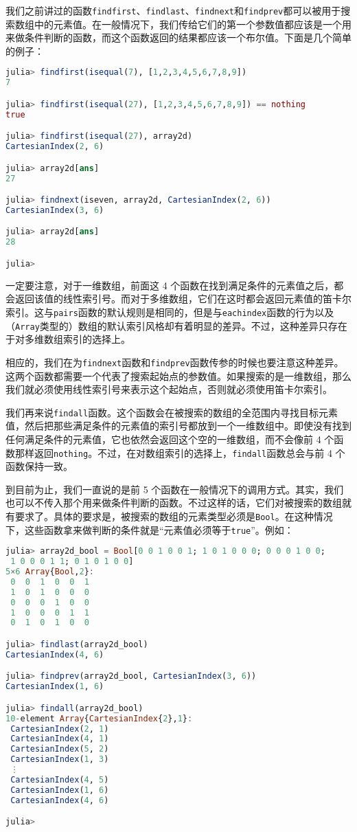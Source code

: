 我们之前讲过的函数\verb`findfirst`、\verb`findlast`、\verb`findnext`和\verb`findprev`都可以被用于搜索数组中的元素值。在一般情况下，我们传给它们的第一个参数值都应该是一个用来做条件判断的函数，而这个函数返回的结果都应该一个布尔值。下面是几个简单的例子：

\begin{lstlisting}[language=julia]
julia> findfirst(isequal(7), [1,2,3,4,5,6,7,8,9])
7

julia> findfirst(isequal(27), [1,2,3,4,5,6,7,8,9]) == nothing
true

julia> findfirst(isequal(27), array2d)
CartesianIndex(2, 6)

julia> array2d[ans]
27

julia> findnext(iseven, array2d, CartesianIndex(2, 6))
CartesianIndex(3, 6)

julia> array2d[ans]
28

julia> 
\end{lstlisting}

一定要注意，对于一维数组，前面这 4 个函数在找到满足条件的元素值之后，都会返回该值的线性索引号。而对于多维数组，它们在这时都会返回元素值的笛卡尔索引。这与\verb`pairs`函数的默认规则是相同的，但是与\verb`eachindex`函数的行为以及（\verb`Array`类型的）数组的默认索引风格却有着明显的差异。不过，这种差异只存在于对多维数组索引的选择上。

相应的，我们在为\verb`findnext`函数和\verb`findprev`函数传参的时候也要注意这种差异。这两个函数都需要一个代表了搜索起始点的参数值。如果搜索的是一维数组，那么我们就必须使用线性索引号来表示这个起始点，否则就必须使用笛卡尔索引。

我们再来说\verb`findall`函数。这个函数会在被搜索的数组的全范围内寻找目标元素值，然后把那些满足条件的元素值的索引号都放到一个一维数组中。即使没有找到任何满足条件的元素值，它也依然会返回这个空的一维数组，而不会像前 4 个函数那样返回\verb`nothing`。不过，在对数组索引的选择上，\verb`findall`函数总会与前 4 个函数保持一致。

到目前为止，我们一直说的是前 5 个函数在一般情况下的调用方式。其实，我们也可以不传入那个用来做条件判断的函数。不过这样的话，它们对被搜索的数组就有要求了。具体的要求是，被搜索的数组的元素类型必须是\verb`Bool`。在这种情况下，这些函数拿来做判断的条件就是“元素值必须等于\verb`true`”。例如：

\begin{lstlisting}[language=julia]
julia> array2d_bool = Bool[0 0 1 0 0 1; 1 0 1 0 0 0; 0 0 0 1 0 0;
 1 0 0 0 1 1; 0 1 0 1 0 0]
5×6 Array{Bool,2}:
 0  0  1  0  0  1
 1  0  1  0  0  0
 0  0  0  1  0  0
 1  0  0  0  1  1
 0  1  0  1  0  0

julia> findlast(array2d_bool)
CartesianIndex(4, 6)

julia> findprev(array2d_bool, CartesianIndex(3, 6))
CartesianIndex(1, 6)

julia> findall(array2d_bool)
10-element Array{CartesianIndex{2},1}:
 CartesianIndex(2, 1)
 CartesianIndex(4, 1)
 CartesianIndex(5, 2)
 CartesianIndex(1, 3)
 ⋮                   
 CartesianIndex(4, 5)
 CartesianIndex(1, 6)
 CartesianIndex(4, 6)

julia> 
\end{lstlisting}

